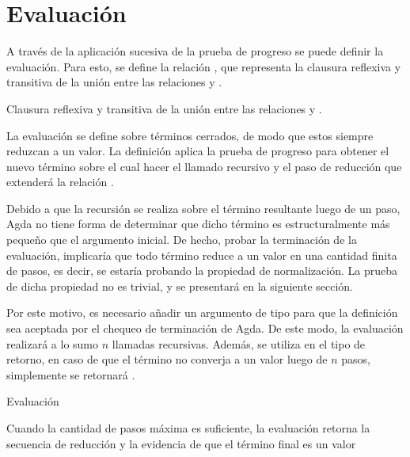 \section{Evaluación}

A través de la aplicación sucesiva de la prueba de progreso se puede definir la evaluación.
Para esto, se define la relación \type{$\_\rightsquigarrow*\_$}, que representa la clausura reflexiva y transitiva de la unión entre las relaciones \type{$\_\hookrightarrow\_$} y \type{$\_\rightleftarrows\_$}.

\begin{codigo}
	Clausura reflexiva y transitiva de la unión entre las relaciones \type{$\_\hookrightarrow\_$} y \type{$\_\rightleftarrows\_$}.
\end{codigo}

La evaluación se define sobre términos cerrados, de modo que estos siempre reduzcan a un valor.
La definición aplica la prueba de progreso para obtener el nuevo término sobre el cual hacer el llamado recursivo y el paso de reducción que extenderá la relación \type{$\_\rightsquigarrow*\_$}.

Debido a que la recursión se realiza sobre el término resultante luego de un paso, Agda no tiene forma de determinar que dicho término es estructuralmente más pequeño que el argumento inicial.
De hecho, probar la terminación de la evaluación, implicaría que todo término reduce a un valor en una cantidad finita de pasos, es decir, se estaría probando la propiedad de normalización.
La prueba de dicha propiedad no es trivial, y se presentará en la siguiente sección.

Por este motivo, es necesario añadir un argumento de tipo  para que la definición sea aceptada por el chequeo de terminación de Agda.
De este modo, la evaluación realizará a lo sumo $n$ llamadas recursivas.
Además, se utiliza  en el tipo de retorno, en caso de que el término no converja a un valor luego de $n$ pasos, simplemente se retornará .


\begin{codigo}
	Evaluación
\end{codigo}

\begin{example}
	Cuando la cantidad de pasos máxima es suficiente, la evaluación retorna la secuencia de reducción y la evidencia de que el término final es un valor
\end{example}

